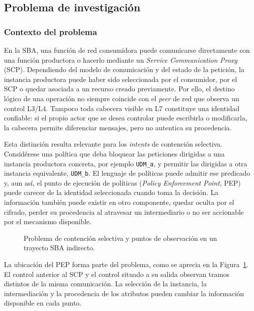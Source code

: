 \subsection{Problema de investigación}
\label{subsec:problema-investigacion}

\subsubsection*{Contexto del problema}

En la SBA, una función de red consumidora puede comunicarse directamente con una función productora o hacerlo mediante un \textit{Service Communication Proxy} (SCP). Dependiendo del modelo de comunicación y del estado de la petición, la instancia productora puede haber sido seleccionada por el consumidor, por el SCP o quedar asociada a un recurso creado previamente. Por ello, el destino lógico de una operación no siempre coincide con el \textit{peer} de red que observa un control L3/L4. Tampoco toda cabecera visible en L7 constituye una identidad confiable: si el propio actor que se desea controlar puede escribirla o modificarla, la cabecera permite diferenciar mensajes, pero no autentica su procedencia.

Esta distinción resulta relevante para los \textit{intents} de contención selectiva. Considérese una política que deba bloquear las peticiones dirigidas a una instancia productora concreta, por ejemplo \texttt{UDM\_a}, y permitir las dirigidas a otra instancia equivalente, \texttt{UDM\_b}. El lenguaje de políticas puede admitir ese predicado y, aun así, el punto de ejecución de políticas (\textit{Policy Enforcement Point}, PEP) puede carecer de la identidad seleccionada cuando toma la decisión. La información también puede existir en otro componente, quedar oculta por el cifrado, perder su procedencia al atravesar un intermediario o no ser accionable por el mecanismo disponible.

\begin{figure}[H]
    \centering
    
    \caption{Problema de contención selectiva y puntos de observación en un trayecto SBA indirecto.}
    \label{fig:problema-contencion-selectiva}
\end{figure}

La ubicación del PEP forma parte del problema, como se aprecia en la Figura~\ref{fig:problema-contencion-selectiva}. El control anterior al SCP y el control situado a su salida observan tramos distintos de la misma comunicación. La selección de la instancia, la intermediación y la procedencia de los atributos pueden cambiar la información disponible en cada punto.


